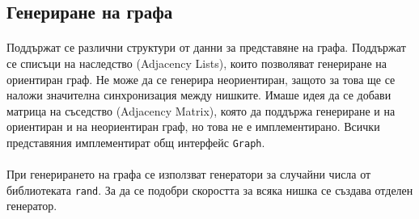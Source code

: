 \subsection*{Генериране на графа}

\paragraph*{} Поддържат се различни структури от данни за представяне на графа. Поддържат се списъци на наследство (Adjacency Lists), които позволяват генериране на ориентиран граф. Не може да се генерира неориентиран, защото за това ще се наложи значителна синхронизация между нишките. Имаше идея да се добави матрица на съседство (Adjacency Matrix), която да поддържа генериране и на ориентиран и на неориентиран граф, но това не е имплементирано. Всички представяния имплементират общ интерфейс \verb|Graph|.

\paragraph*{} При генерирането на графа се използват генератори за случайни числа от библиотеката \verb|rand|. За да се подобри скоростта за всяка нишка се създава отделен генератор.
